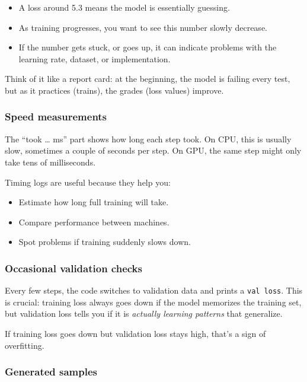\documentclass[
  letterpaper,
  DIV=11,
  numbers=noendperiod]{scrreprt}
\providecommand{\tightlist}{%
  \setlength{\itemsep}{0pt}\setlength{\parskip}{0pt}}
\begin{document}
\begin{itemize}
\tightlist
\item
  A loss around 5.3 means the model is essentially guessing.
\item
  As training progresses, you want to see this number slowly decrease.
\item
  If the number gets stuck, or goes up, it can indicate problems with
  the learning rate, dataset, or implementation.
\end{itemize}

Think of it like a report card: at the beginning, the model is failing
every test, but as it practices (trains), the grades (loss values)
improve.

\subsubsection{Speed measurements}\label{speed-measurements}

The ``took \ldots{} ms'' part shows how long each step took. On CPU,
this is usually slow, sometimes a couple of seconds per step. On GPU,
the same step might only take tens of milliseconds.

Timing logs are useful because they help you:

\begin{itemize}
\tightlist
\item
  Estimate how long full training will take.
\item
  Compare performance between machines.
\item
  Spot problems if training suddenly slows down.
\end{itemize}

\subsubsection{Occasional validation
checks}\label{occasional-validation-checks}

Every few steps, the code switches to validation data and prints a
\texttt{val\ loss}. This is crucial: training loss always goes down if
the model memorizes the training set, but validation loss tells you if
it is \emph{actually learning patterns} that generalize.

If training loss goes down but validation loss stays high, that's a sign
of overfitting.

\subsubsection{Generated samples}\label{generated-samples}
\end{document}
